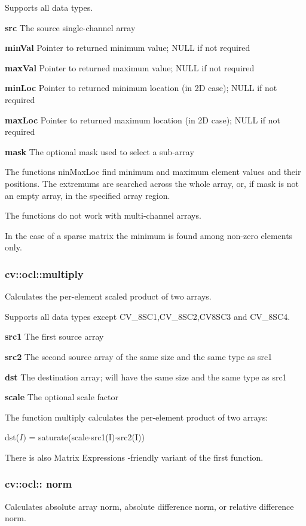 \documentclass{article}
\begin{document}
Supports all data types.

\textbf{src }The source single-channel array

\textbf{minVal }Pointer to returned minimum value; NULL if not required

\textbf{maxVal }Pointer to returned maximum value; NULL if not required

\textbf{minLoc }Pointer to returned minimum location (in 2D case); NULL if
not required

\textbf{maxLoc }Pointer to returned maximum location (in 2D case); NULL if
not required

\textbf{mask }The optional mask used to select a sub-array

The functions ninMaxLoc find minimum and maximum element values and their
positions. The extremums are searched across the whole array, or, if mask is
not an empty array, in the specified array region.

The functions do not work with multi-channel arrays.

In the case of a sparse matrix the minimum is found among non-zero elements
only.

\newpage

\subsubsection{cv::ocl::multiply}
\label{subsubsec:mylabel23}
Calculates the per-element scaled product of two arrays.

Supports all data types except CV{\_}8SC1,CV{\_}8SC2,CV8SC3 and CV{\_}8SC4.

\textbf{src1} The first source array

\textbf{src2 } The second source array of the same size and the same type as
src1

\textbf{dst } The destination array; will have the same size and the same
type as src1

\textbf{scale} The optional scale factor

The function multiply calculates the per-element product of two arrays:

dst($I)$ = saturate(scale$\cdot $src1(I)$\cdot $src2(I))

There is also Matrix Expressions -friendly variant of the first function.

\newpage

\subsubsection{cv::ocl:: norm }
\label{subsubsec:mylabel24}
Calculates absolute array norm, absolute difference norm, or relative
difference norm.
\end{document}
